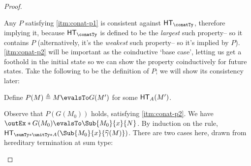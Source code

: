 \documentclass[letterpaper]{article}
\newcommand{\gmhat}[1]{\ensuremath{\widehat{\gamma}(#1)}}
\begin{document}
\begin{proof}
\begin{enumerate}
            Any $P$ satisfying \ref{itm:conat-p1} is consistent against
            $\HT[\conatTy]$, therefore implying it, because $\HT[\conatTy]$ is
            defined to be the \textit{largest} such property-- so it contains
            $P$ (alternatively, it's the \textit{weakest} such property-- so
            it's implied by $P$). \ref{itm:conat-p2} will be important as the
            coinductive `base case', letting us get a foothold in the initial
            state so we can show the property coinductively for future states.
            Take the following to be the definition of $P$; we will show its
            consistency later:

            \begin{definition}[Definition of $P$]
                Define $P(M) \triangleq M \evalsTo G(M')$ for some $\HT[A](M')$.
            \end{definition}



            Observe that $P(G(M_0))$ holds, satisfying \ref{itm:conat-p2}.
            We have $\outEx*{G(M_0)} \evalsTo \Sub{M_0}{x}{N}$.
            By induction on the rule, $\HT[\sumTy*{\unitTy*}{A}](\Sub{M_0}{x}{\gmhat{M}})$.
            There are two cases here, drawn from hereditary termination at sum type:


\end{enumerate}
\end{proof}
\end{document}
